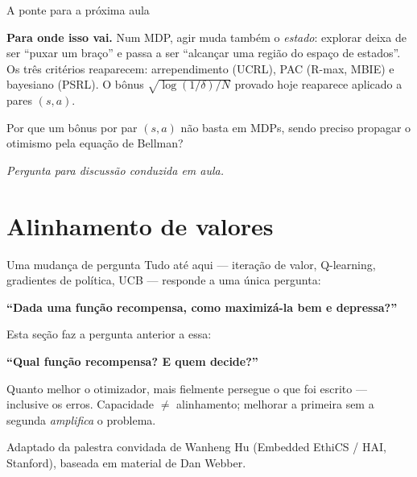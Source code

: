 \documentclass[aspectratio=169, 11pt]{beamer}
\newcommand{\paradiscussao}{\smallskip
  {\footnotesize\color{rlCinza}\itshape Pergunta para discussão conduzida em aula.}}
\begin{document}
\begin{frame}{A ponte para a próxima aula}
  \begin{ideiabox}
    \textbf{Para onde isso vai.} Num MDP, agir muda também o \emph{estado}:
    explorar deixa de ser ``puxar um braço'' e passa a ser ``alcançar uma
    região do espaço de estados''. Os três critérios reaparecem:
    arrependimento (UCRL), PAC (R-max, MBIE) e bayesiano (PSRL). O bônus
    $\sqrt{\log(1/\delta)/N}$ provado hoje reaparece aplicado a pares
    $(s,a)$.
  \end{ideiabox}

  \begin{quizbox}{}
    Por que um bônus por par $(s,a)$ não basta em MDPs, sendo preciso propagar
    o otimismo pela equação de Bellman?
  \end{quizbox}
  \paradiscussao
\end{frame}

\section{Alinhamento de valores}

\begin{frame}{Uma mudança de pergunta}
  Tudo até aqui --- iteração de valor, Q-learning, gradientes de política,
  UCB --- responde a uma única pergunta:

  \begin{center}
    {\large\color{rlAzul}\bfseries ``Dada uma função recompensa, como
    maximizá-la bem e depressa?''}
  \end{center}

  Esta seção faz a pergunta anterior a essa:

  \begin{center}
    {\large\color{rlLaranja}\bfseries ``Qual função recompensa? E quem decide?''}
  \end{center}

  \begin{ideiabox}
    Quanto melhor o otimizador, mais fielmente persegue o que foi escrito ---
    inclusive os erros. Capacidade $\neq$ alinhamento; melhorar a primeira
    sem a segunda \emph{amplifica} o problema.
  \end{ideiabox}

  {\footnotesize\color{rlCinza} Adaptado da palestra convidada de Wanheng Hu
  (Embedded EthiCS / HAI, Stanford), baseada em material de Dan Webber.}
\end{frame}
\end{document}

